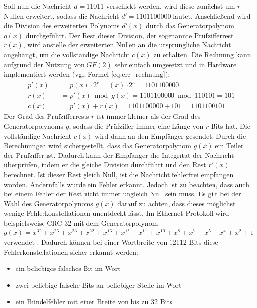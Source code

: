 Soll nun die Nachricht \(d = 11011\) verschickt  werden, wird diese zunächst um \(r\) Nullen erweitert, sodass die Nachricht \(d' = 1101100000\) lautet. Anschließend wird die Division des erweiterten Polynoms \(d'(x)\) durch das Generatorpolynom \(g(x)\) durchgeführt. Der Rest dieser Division, der sogenannte Prüfzifferrest \(r(x)\), wird anstelle der erweiterten Nullen an die ursprüngliche Nachricht angehängt, um die vollständige Nachricht \(c(x)\) zu erhalten. Die Rechnung kann aufgrund der Nutzung von \(GF(2)\) sehr einfach umgesetzt und in Hardware implementiert werden (vgl. Formel \ref{eq:crc_rechnung}):
\begin{equation}
\label{eq:crc_rechnung}
\begin{alignedat}{2}
    &p'(x) &&= p(x) \cdot 2^r = (x) \cdot 2^5 = 1101100000 \\
    &r(x)  &&= p'(x) \bmod g(x) = 1101100000 \bmod 110101 = 101 \\
    &c(x)  &&= p'(x) + r(x) = 1101100000 + 101 = 1101100101
\end{alignedat}
\end{equation}
Der Grad des Prüfzifferrests \(r\) ist immer kleiner als der Grad des Generatorpolynoms \(g\), sodass die Prüfziffer immer eine Länge von \(r\) Bits hat. Die vollständige Nachricht \(c(x)\) wird dann an den Empfänger gesendet. Durch die Berechnungen wird sichergestellt, dass das Generatorpolynom \(g(x)\) ein Teiler der Prüfziffer ist. Dadurch kann der Empfänger die Integrität der Nachricht überprüfen, indem er die gleiche Division durchführt und den Rest \(r'(x)\) berechnet. Ist dieser Rest gleich Null, ist die Nachricht fehlerfrei empfangen worden. Andernfalls wurde ein Fehler erkannt. Jedoch ist zu beachten, dass auch bei einem Fehler der Rest nicht immer ungleich Null sein muss. Es gilt bei der Wahl des Generatorpolynoms \(g(x)\) darauf zu achten, dass dieses möglichst wenige Fehlerkonstellationen unentdeckt lässt. Im Ethernet-Protokoll wird beispielsweise \ac{CRC}-32 mit dem Generatorpolynom \(g(x) = x^{32} + x^{26} + x^{23} + x^{22} + x^{16} + x^{12} + x^{11} + x^{10} + x^{8} + x^{7} + x^{5} + x^{4} + x^{2} + 1\) verwendet \cite{Springer_CRC}. Dadurch können bei einer Wortbreite von 12112 Bits diese  Fehlerkonstellationen sicher erkannt werden:
\begin{itemize}[nosep]
    \item ein beliebiges falsches Bit im Wort
    \item zwei beliebige falsche Bits an beliebiger Stelle im Wort
    \item ein Bündelfehler mit einer Breite von bis zu 32 Bits
\end{itemize}

